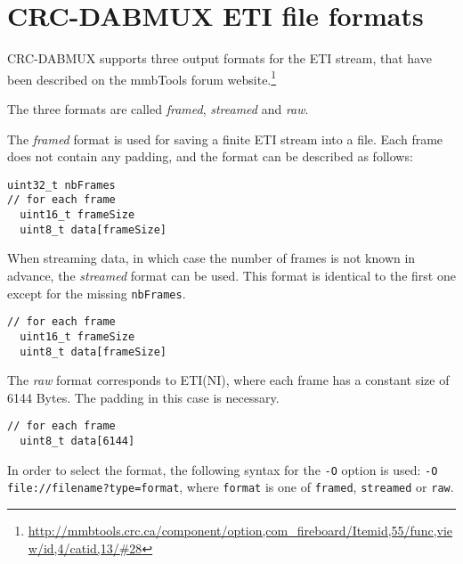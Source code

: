 
\section{CRC-DABMUX ETI file formats}
\label{etiformat}
CRC-DABMUX supports three output formats for the ETI stream, that have been described on the mmbTools forum
website.\footnote{\url{http://mmbtools.crc.ca/component/option,com\_fireboard/Itemid,55/func,view/id,4/catid,13/\#28}}

The three formats are called \emph{framed}, \emph{streamed} and \emph{raw}.

The \emph{framed} format is used for saving a finite ETI stream into a file. Each frame does not contain any padding, and the
format can be described as follows:
\begin{lstlisting} 
uint32_t nbFrames
// for each frame
  uint16_t frameSize
  uint8_t data[frameSize]
\end{lstlisting}

When streaming data, in which case the number of frames is not known in advance, the \emph{streamed} format can be used.
This format is identical to the first one except for the missing \texttt{nbFrames}.
\begin{lstlisting} 
// for each frame
  uint16_t frameSize
  uint8_t data[frameSize]
\end{lstlisting}

The \emph{raw} format corresponds to ETI(NI), where each frame has a constant size of 6144 Bytes. The padding in this
case is necessary.
\begin{lstlisting} 
// for each frame
  uint8_t data[6144]
\end{lstlisting}

In order to select the format, the following syntax for the \texttt{-O} option is used:
\texttt{-O file://filename?type=format}, where \texttt{format} is one of \verb+framed+, \verb+streamed+ or
\verb+raw+.


